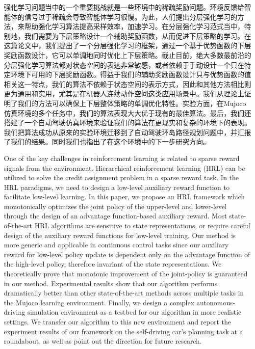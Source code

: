 \begin{cabstract}
强化学习问题当中的一个重要挑战就是一些环境中的稀疏奖励问题。环境反馈给智能体的信号过于稀疏会导致智能体学习很慢。为此，人们提出分层强化学习的方法，来帮助强化学习算法提高采样效率，加速学习。在分层强化学习范式当中，特别地，我们需要为下层策略设计一个辅助奖励函数，从而促进下层策略的学习。在这篇论文中，我们提出了一个分层强化学习的框架，通过一个基于优势函数的下层奖励函数设计，它可以单调地同时优化上下层策略。截止目前，绝大多数最前沿的分层强化学习算法都对状态空间的表达非常敏感，或者依赖于手动设计一个只在特定环境下可用的下层奖励函数。得益于我们的辅助奖励函数设计只与优势函数的值相关这一特点，我们的算法不依赖于状态空间的表示方式，因此和其他方法相比则更为通用和实用，尤其是在机器人连续动作空间这类应用场景中。我们从理论上证明了我们的方法可以确保上下层整体策略的单调优化特性。实验方面，在Mujoco仿真环境的多个任务中，我们的算法表现大大优于现有的最佳算法。最后，我们还搭建了一个自动驾驶仿真环境来验证我们的算法在更现实和复杂的环境下的表现。我们把算法成功从原来的实验环境迁移到了自动驾驶环岛路径规划问题中，并汇报了我们的结果。同时我们也指出了在这个环境中的下一步研究方向。
\end{cabstract}

\begin{eabstract}
One of the key challenges in reinforcement learning is related to sparse reward signals from the environment. Hierarchical reinforcement learning (HRL) can be utilized to solve the credit assignment problem in a sparse reward task. In the HRL paradigms, we need to design a low-level auxiliary reward function to facilitate low-level learning. In this paper, we propose an HRL framework which monotonically  optimizes the joint policy of the upper-level and lower-level  through the design of an advantage function-based auxiliary reward. Most state-of-the-art HRL algorithms are sensitive to state representations, or require careful design of the auxiliary reward functions  for low-level training. Our method is more generic and applicable in continuous control tasks since our auxiliary reward for low-level policy update is dependent only on the advantage function of the high-level policy, therefore invariant of the state representations. We theoretically prove that monotonic improvement of the joint-policy is guaranteed in our method. Experimental results show that our algorithm performs dramatically better than other state-of-the-art methods across multiple tasks in the Mujoco learning environment. Finally, we design a complex autonomous-driving simulation environment as a testbed for our algorithm in more realistic settings. We transfer our algorithm to this new environment and report the experiment results of our framework on the self-driving car's planning task at a roundabout, as well as point out the direction for future research.

\end{eabstract}


